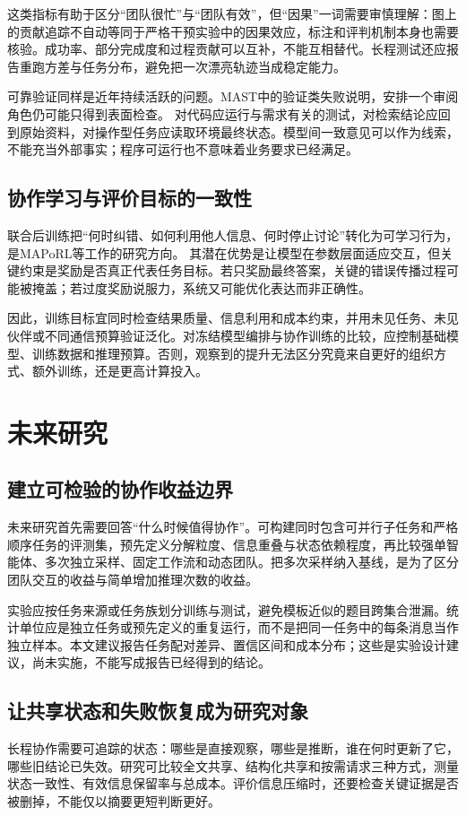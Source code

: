 \documentclass[UTF8,a4paper,fontset=fandol,zihao=5,openany]{ctexrep}
\begin{document}
这类指标有助于区分“团队很忙”与“团队有效”，但“因果”一词需要审慎理解：图上的贡献追踪不自动等同于严格干预实验中的因果效应，标注和评判机制本身也需要核验。成功率、部分完成度和过程贡献可以互补，不能互相替代。长程测试还应报告重跑方差与任务分布，避免把一次漂亮轨迹当成稳定能力。

可靠验证同样是近年持续活跃的问题。MAST中的验证类失败说明，安排一个审阅角色仍可能只得到表面检查。\cite{mast} 对代码应运行与需求有关的测试，对检索结论应回到原始资料，对操作型任务应读取环境最终状态。模型间一致意见可以作为线索，不能充当外部事实；程序可运行也不意味着业务要求已经满足。


\section{协作学习与评价目标的一致性}
联合后训练把“何时纠错、如何利用他人信息、何时停止讨论”转化为可学习行为，是MAPoRL等工作的研究方向。\cite{maporl} 其潜在优势是让模型在参数层面适应交互，但关键约束是奖励是否真正代表任务目标。若只奖励最终答案，关键的错误传播过程可能被掩盖；若过度奖励说服力，系统又可能优化表达而非正确性。

因此，训练目标宜同时检查结果质量、信息利用和成本约束，并用未见任务、未见伙伴或不同通信预算验证泛化。对冻结模型编排与协作训练的比较，应控制基础模型、训练数据和推理预算。否则，观察到的提升无法区分究竟来自更好的组织方式、额外训练，还是更高计算投入。


\chapter{未来研究}

\section{建立可检验的协作收益边界}
未来研究首先需要回答“什么时候值得协作”。可构建同时包含可并行子任务和严格顺序任务的评测集，预先定义分解粒度、信息重叠与状态依赖程度，再比较强单智能体、多次独立采样、固定工作流和动态团队。把多次采样纳入基线，是为了区分团队交互的收益与简单增加推理次数的收益。

实验应按任务来源或任务族划分训练与测试，避免模板近似的题目跨集合泄漏。统计单位应是独立任务或预先定义的重复运行，而不是把同一任务中的每条消息当作独立样本。本文建议报告任务配对差异、置信区间和成本分布；这些是实验设计建议，尚未实施，不能写成报告已经得到的结论。


\section{让共享状态和失败恢复成为研究对象}
长程协作需要可追踪的状态：哪些是直接观察，哪些是推断，谁在何时更新了它，哪些旧结论已失效。研究可比较全文共享、结构化共享和按需请求三种方式，测量状态一致性、有效信息保留率与总成本。评价信息压缩时，还要检查关键证据是否被删掉，不能仅以摘要更短判断更好。
\end{document}
